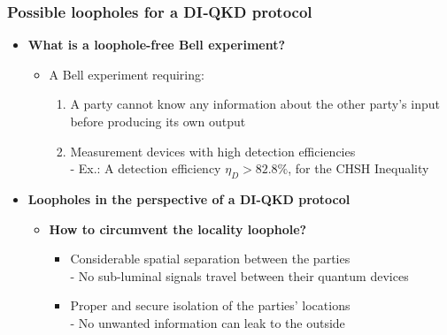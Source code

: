\documentclass{beamer}
\begin{document}
		\begin{frame}
			\frametitle{\Large Possible loopholes for a DI‑QKD protocol}

            \vspace{3.5ex}
            \begin{itemize}
                \item \textbf{What is a loophole-free Bell experiment?}
                \begin{itemize}
                    \item A Bell experiment requiring:
                    \begin{enumerate}
                        \item A party cannot know any information about the other party's input before producing its own output
                        \item Measurement devices with high detection efficiencies\\
                        \footnotesize
                        - Ex.: A detection efficiency ${\eta}_{D} > 82.8\%$, for the CHSH Inequality
                    \end{enumerate}
                \end{itemize}
                \vspace{1ex}
                \item \textbf{Loopholes in the perspective of a DI-QKD protocol}
                \begin{itemize}
                    \item \textbf{How to circumvent the locality loophole?}
                    \begin{itemize}
                        \small
                        \item Considerable spatial separation between the parties\\
                        \footnotesize
                        - No sub-luminal signals travel between their quantum devices
                        \small
                        \item Proper and secure isolation of the parties' locations\\
                        \footnotesize
                        - No unwanted information can leak to the outside
                    \end{itemize}
                \end{itemize}
            \end{itemize}
		\end{frame}
\end{document}
